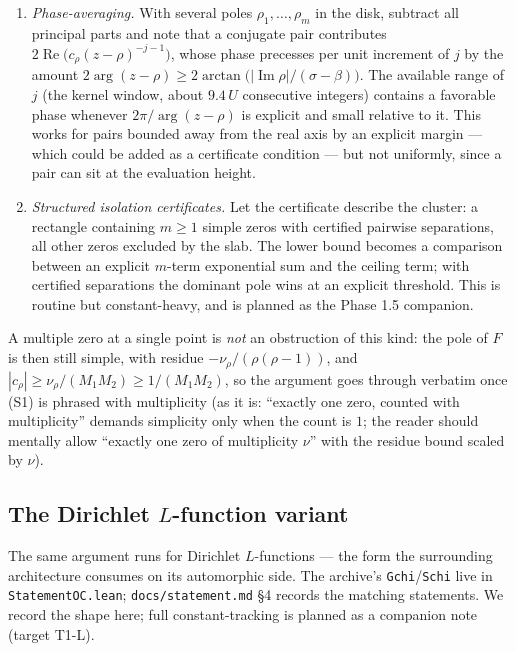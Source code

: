 \documentclass[11pt]{amsart}
\numberwithin{equation}{section}
\newcommand{\re}{\operatorname{Re}}
\newcommand{\im}{\operatorname{Im}}
\newcommand{\Sig}{\sigma}
\begin{document}
\begin{enumerate}
\item \emph{Phase-averaging.} With several poles $\rho_1, \ldots,
\rho_m$ in the disk, subtract all principal parts and note that a
conjugate pair contributes $2\re\bigl(c_\rho (z-\rho)^{-j-1}\bigr)$,
whose phase precesses per unit increment of $j$ by the amount
$2\arg(z-\rho) \ge 2\arctan\bigl(|\im\rho|/(\Sig-\beta)\bigr)$. The
available range of $j$ (the kernel window, about $9.4\,U$ consecutive
integers) contains a favorable phase whenever
$2\pi/\arg(z-\rho)$ is explicit and small relative to it. This works
for pairs bounded away from the real axis by an explicit margin ---
which could be added as a certificate condition --- but not
uniformly, since a pair can sit at the evaluation height.
\item \emph{Structured isolation certificates.} Let the certificate
describe the cluster: a rectangle containing $m \ge 1$ simple zeros
with certified pairwise separations, all other zeros excluded by the
slab. The lower bound becomes a comparison between an explicit
$m$-term exponential sum and the ceiling term; with certified
separations the dominant pole wins at an explicit threshold. This is
routine but constant-heavy, and is planned as the Phase 1.5 companion.
\end{enumerate}

A multiple zero at a single point is \emph{not} an obstruction of this
kind: the pole of $F$ is then still simple, with residue
$-\nu_\rho/(\rho(\rho-1))$, and $|c_\rho| \ge \nu_\rho/(M_1M_2) \ge
1/(M_1M_2)$, so the argument goes through verbatim once (S1) is
phrased with multiplicity (as it is: ``exactly one zero, counted with
multiplicity'' demands simplicity only when the count is $1$; the
reader should mentally allow ``exactly one zero of multiplicity
$\nu$'' with the residue bound scaled by $\nu$).

\subsection{The Dirichlet $L$-function variant}\label{sec:lfunction}

The same argument runs for Dirichlet $L$-functions --- the form the
surrounding architecture consumes on its automorphic side. The
archive's \texttt{Gchi}/\texttt{Schi} live in
\texttt{StatementOC.lean}; \texttt{docs/statement.md} \S4 records the
matching statements. We record the shape here; full
constant-tracking is planned as a companion note (target T1-L).
\end{document}
